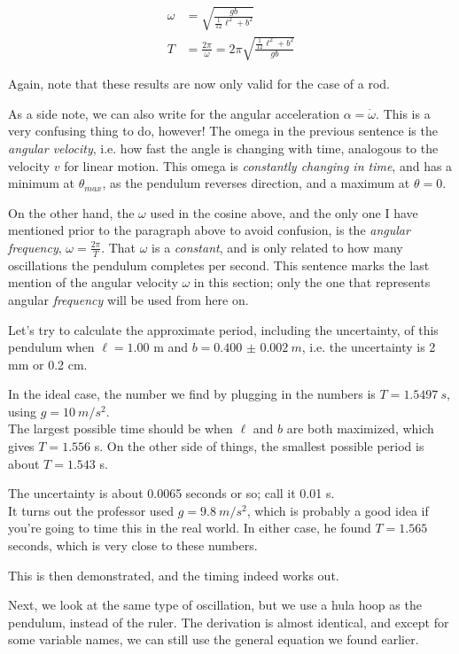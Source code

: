 \documentclass[8.01x]{subfiles}
\begin{document}
\begin{align}
\omega    &= \sqrt{\frac{g b}{\frac{1}{12} \ell^2 + b^2}}\\
T         &= \frac{2 \pi}{\omega} = 2 \pi \sqrt{\frac{\frac{1}{12} \ell^2 + b^2}{g b}}
\end{align}

Again, note that these results are now only valid for the case of a rod.

As a side note, we can also write for the angular acceleration $\alpha = \dot{\omega}$. This is a very confusing thing to do, however! The omega in the previous sentence is the \emph{angular velocity}, i.e. how fast the angle is changing with time, analogous to the velocity $v$ for linear motion. This omega is \emph{constantly changing in time}, and has a minimum at $\theta_{max}$, as the pendulum reverses direction, and a maximum at $\theta = 0$.

On the other hand, the $\omega$ used in the cosine above, and the only one I have mentioned prior to the paragraph above to avoid confusion, is the \emph{angular frequency}, $\displaystyle \omega = \frac{2 \pi}{T}$. That $\omega$ is a \emph{constant}, and is only related to how many oscillations the pendulum completes per second. This sentence marks the last mention of the angular velocity $\omega$ in this section; only the one that represents angular \emph{frequency} will be used from here on.

Let's try to calculate the approximate period, including the uncertainty, of this pendulum when $\ell = 1.00$ m and $b = \SI{0.400(2)}{m}$, i.e. the uncertainty is 2 mm or 0.2 cm.

In the ideal case, the number we find by plugging in the numbers is $T = \SI{1.5497}{s}$, using $g = \SI{10}{m/s^2}$.\\
The largest possible time should be when $\ell$ and $b$ are both maximized, which gives $T = 1.556$ s. On the other side of things, the smallest possible period is about $T = 1.543$ s.

The uncertainty is about 0.0065 seconds or so; call it 0.01 s.\\
It turns out the professor used $g = \SI{9.8}{m/s^2}$, which is probably a good idea if you're going to time this in the real world. In either case, he found $T = 1.565$ seconds, which is very close to these numbers.

This is then demonstrated, and the timing indeed works out.

Next, we look at the same type of oscillation, but we use a hula hoop as the pendulum, instead of the ruler. The derivation is almost identical, and except for some variable names, we can still use the general equation we found earlier.
\end{document}
